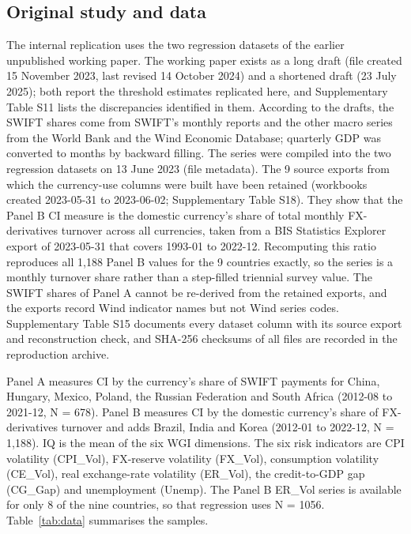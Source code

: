 \documentclass[preprint,12pt,authoryear]{elsarticle}
\begin{document}
\subsection{Original study and data}
The internal replication uses the two regression datasets of the earlier unpublished working paper. The working paper exists as a long draft (file created 15 November 2023, last revised 14 October 2024) and a shortened draft (23 July 2025); both report the threshold estimates replicated here, and Supplementary Table S11 lists the discrepancies identified in them. According to the drafts, the SWIFT shares come from SWIFT's monthly reports and the other macro series from the World Bank and the Wind Economic Database; quarterly GDP was converted to months by backward filling. The series were compiled into the two regression datasets on 13 June 2023 (file metadata). The 9 source exports from which the currency-use columns were built have been retained (workbooks created 2023-05-31 to 2023-06-02; Supplementary Table S18). They show that the Panel B CI measure is the domestic currency's share of total monthly FX-derivatives turnover across all currencies, taken from a BIS Statistics Explorer export of 2023-05-31 that covers 1993-01 to 2022-12. Recomputing this ratio reproduces all 1,188 Panel B values for the 9 countries exactly, so the series is a monthly turnover share rather than a step-filled triennial survey value. The SWIFT shares of Panel A cannot be re-derived from the retained exports, and the exports record Wind indicator names but not Wind series codes. Supplementary Table S15 documents every dataset column with its source export and reconstruction check, and SHA-256 checksums of all files are recorded in the reproduction archive.

Panel A measures CI by the currency's share of SWIFT payments for China, Hungary, Mexico, Poland, the Russian Federation and South Africa (2012-08 to 2021-12, N = 678). Panel B measures CI by the domestic currency's share of FX-derivatives turnover and adds Brazil, India and Korea (2012-01 to 2022-12, N = 1,188). IQ is the mean of the six WGI dimensions. The six risk indicators are CPI volatility (CPI\_Vol), FX-reserve volatility (FX\_Vol), consumption volatility (CE\_Vol), real exchange-rate volatility (ER\_Vol), the credit-to-GDP gap (CG\_Gap) and unemployment (Unemp). The Panel B ER\_Vol series is available for only 8 of the nine countries, so that regression uses N = 1056. Table~\ref{tab:data} summarises the samples.
\end{document}
